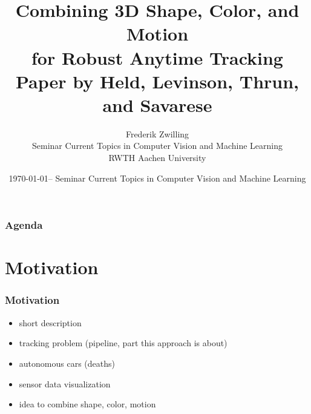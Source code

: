 

\newcommand{\backupbegin}{
   \newcounter{finalframe}
   \setcounter{finalframe}{\value{framenumber}}
}
\newcommand{\backupend}{
   \setcounter{framenumber}{\value{finalframe}}
}

\newcommand*\colvec[3][]{
    \begin{pmatrix}\ifx\relax#1\relax\else#1\\\fi#2\\#3\end{pmatrix}
}
\newcommand{\mattwo}[4]{\begin{pmatrix} #1 & #2 \\ #3 & #4\end{pmatrix}}

\title[Combining 3D Shape, Color, and Motion for Robust Anytime Tracking]{Combining 3D Shape, Color, and Motion\\ for Robust Anytime Tracking\\ \small{Paper by Held, Levinson, Thrun, and Savarese}}
\author[Zwilling]{%
  Frederik Zwilling\\
  \bigskip
  {\scriptsize Seminar Current Topics in Computer Vision and Machine Learning\\ RWTH Aachen University}
}

\date[\today @ Seminar CVML]{\today -- Seminar Current Topics in Computer Vision and Machine Learning}



\frame[plain]{\titlepage}
\addtocounter{framenumber}{-1}

\begin{frame}
  \frametitle{Agenda}
  \tableofcontents[hideallsubsections]
\end{frame}

\section{Motivation}
\begin{frame}
  \frametitle{Motivation}
  \begin{itemize}
  \item short description
  \item tracking problem (pipeline, part this approach is about)
  \item autonomous cars (deaths)
  \item sensor data visualization
  \item idea to combine shape, color, motion
  \end{itemize}
\end{frame}

